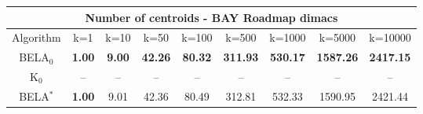 \begin{tabular}{c|cccccccc}\toprule
\multicolumn{9}{c}{Number of centroids - BAY Roadmap dimacs}\\ \midrule
Algorithm & k=1 & k=10 & k=50 & k=100 & k=500 & k=1000 & k=5000 & k=10000 \\ \midrule
BELA$_0$ & \textbf{1.00} & \textbf{9.00} & \textbf{42.26} & \textbf{80.32} & \textbf{311.93} & \textbf{530.17} & \textbf{1587.26} & \textbf{2417.15} \\
K$_0$ & -- & -- & -- & -- & -- & -- & -- & -- \\
BELA$^*$ & \textbf{1.00} & 9.01 & 42.36 & 80.49 & 312.81 & 532.33 & 1590.95 & 2421.44 \\ \bottomrule 
\end{tabular}
